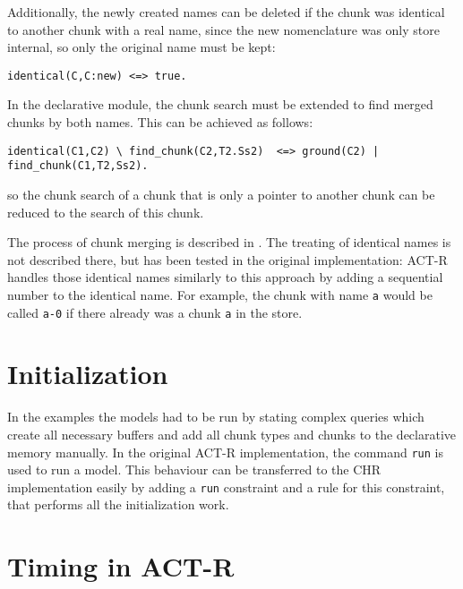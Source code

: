 Additionally, the newly created names can be deleted if the chunk was identical to another chunk with a real name, since the new nomenclature was only store internal, so only the original name must be kept:

\begin{lstlisting}
identical(C,C:new) <=> true.
\end{lstlisting}

In the declarative module, the chunk search must be extended to find merged chunks by both names. This can be achieved as follows:

\begin{lstlisting}
identical(C1,C2) \ find_chunk(C2,T2.Ss2)  <=> ground(C2) | find_chunk(C1,T2,Ss2).
\end{lstlisting}

so the chunk search of a chunk that is only a pointer to another chunk can be reduced to the search of this chunk. 

The process of chunk merging is described in \cite[??]{actr_reference}. The treating of identical names is not described there, but has been tested in the original implementation: ACT-R handles those identical names similarly to this approach by adding a sequential number to the identical name. For example, the chunk with name \verb|a| would be called \verb|a-0| if there already was a chunk \verb|a| in the store.

\section{Initialization}

In the examples the models had to be run by stating complex queries which create all necessary buffers and add all chunk types and chunks to the declarative memory manually. In the original ACT-R implementation, the command \verb|run| is used to run a model. This behaviour can be transferred to the CHR implementation easily by adding a \verb|run| constraint and a rule for this constraint, that performs all the initialization work.


\section{Timing in ACT-R}

